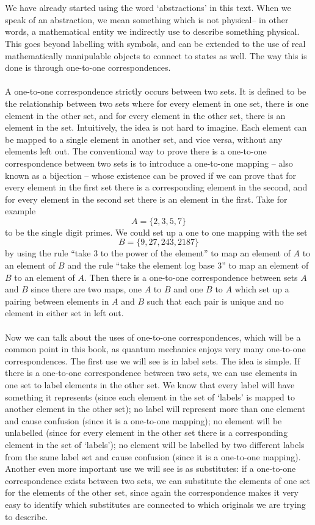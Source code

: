\\\\
We have already started using the word `abstractions' in this text. When we speak of an abstraction, we mean something which is not physical-- in other words, a mathematical entity we indirectly use to describe something physical. This goes beyond labelling with symbols, and can be extended to the use of real mathematically manipulable objects to connect to states as well. The way this is done is through one-to-one correspondences.
\\\\
A one-to-one correspondence strictly occurs between two sets. It is defined to be the relationship between two sets where for every element in one set, there is one element in the other set, and for every element in the other set, there is an element in the set. Intuitively, the idea is not hard to imagine. Each element can be mapped to a single element in another set, and vice versa, without any elements left out. The conventional way to prove there is a one-to-one correspondence between two sets is to introduce a one-to-one mapping -- also known as a bijection -- whose existence can be proved if we can prove that for every element in the first set there is a corresponding element in the second, and for every element in the second set there is an element in the first. Take for example
$$
A=\{2,3,5,7\}
$$
to be the single digit primes. We could set up a one to one mapping with the set 
$$
B=\{9,27,243,2187\}
$$
by using the rule ``take 3 to the power of the element'' to map an element of $A$ to an element of $B$ and the rule ``take the element log base 3'' to map an element of $B$ to an element of $A$. Then there is a one-to-one correspondence between sets $A$ and $B$ since there are two maps, one $A$ to $B$ and one $B$ to $A$ which set up a pairing between elements in $A$ and $B$ such that each pair is unique and no element in either set in left out.
\\\\
Now we can talk about the uses of one-to-one correspondences, which will be a common point in this book, as quantum mechanics enjoys very many one-to-one correspondences. The first use we will see is in label sets. The idea is simple. If there is a one-to-one correspondence between two sets, we can use elements in one set to label elements in the other set. We know that every label will have something it represents (since each element in the set of `labels' is mapped to another element in the other set); no label will represent more than one element and cause confusion (since it is a one-to-one mapping); no element will be unlabelled (since for every element in the other set there is a corresponding element in the set of `labels'); no element will be labelled by two different labels from the same label set and cause confusion (since it is a one-to-one mapping). Another even more important use we will see is as substitutes: if a one-to-one correspondence exists between two sets, we can substitute the elements of one set for the elements of the other set, since again the correspondence makes it very easy to identify which substitutes are connected to which originals we are trying to describe.

